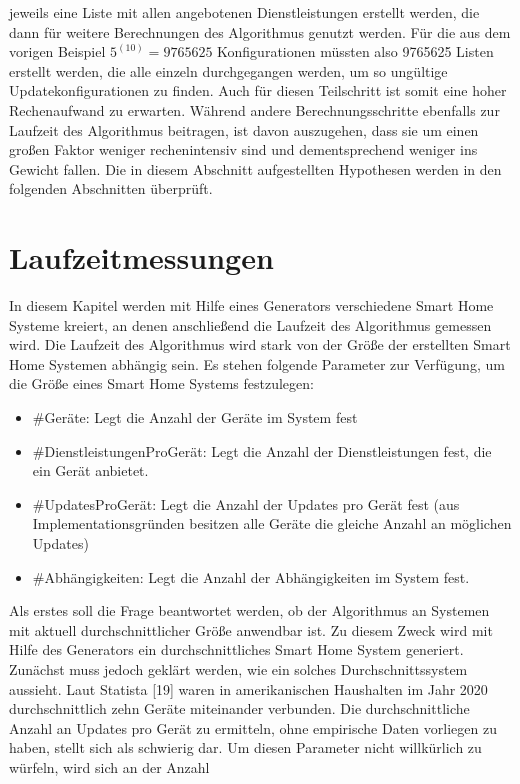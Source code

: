jeweils eine Liste mit allen angebotenen Dienstleistungen erstellt werden, die dann für weitere Berechnungen des Algorithmus genutzt werden. 
Für die aus dem vorigen Beispiel \( 5^{(10)} = 9765625\) Konfigurationen müssten
also 9765625 Listen erstellt werden, die alle einzeln durchgegangen werden, um so ungültige Updatekonfigurationen zu finden. Auch für diesen Teilschritt 
ist somit eine hoher Rechenaufwand zu erwarten. Während andere
Berechnungsschritte ebenfalls zur Laufzeit des Algorithmus beitragen, ist davon auszugehen, dass sie um einen großen Faktor weniger
rechenintensiv sind und dementsprechend weniger ins Gewicht fallen. Die in diesem Abschnitt aufgestellten Hypothesen werden in den folgenden Abschnitten
überprüft. 

\section{Laufzeitmessungen}
In diesem Kapitel werden mit Hilfe eines Generators verschiedene Smart Home Systeme kreiert, an denen anschließend die Laufzeit des Algorithmus gemessen wird. 
Die Laufzeit des Algorithmus wird stark von der Größe der erstellten Smart Home Systemen abhängig sein. Es stehen folgende Parameter zur Verfügung, um
die Größe eines Smart Home Systems festzulegen: 
\begin{itemize}
\item \#Geräte: Legt die Anzahl der Geräte im System fest
\item \#DienstleistungenProGerät: Legt die Anzahl der Dienstleistungen fest, die ein Gerät anbietet.
\item \#UpdatesProGerät: Legt die Anzahl der Updates pro Gerät fest (aus Implementationsgründen besitzen alle Geräte die gleiche Anzahl an möglichen Updates)
\item \#Abhängigkeiten: Legt die Anzahl der Abhängigkeiten im System fest.
\end{itemize}
Als erstes soll die Frage beantwortet werden, ob der Algorithmus an Systemen mit aktuell durchschnittlicher Größe anwendbar ist.
Zu diesem Zweck wird mit Hilfe des Generators ein durchschnittliches Smart Home System generiert.
Zunächst muss jedoch geklärt werden, wie ein solches Durchschnittssystem aussieht. Laut Statista [19] waren
in amerikanischen Haushalten im Jahr 2020 durchschnittlich zehn Geräte miteinander verbunden. Die durchschnittliche Anzahl an Updates pro Gerät zu
ermitteln, ohne empirische Daten vorliegen zu haben, stellt sich als schwierig dar. Um diesen Parameter nicht willkürlich zu würfeln, wird sich an der Anzahl
